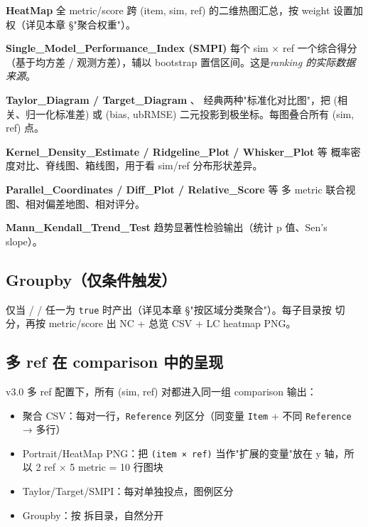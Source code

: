 \textbf{HeatMap}  全 metric/score 跨 (item, sim, ref) 的二维热图汇总，按 weight 设置加权（详见本章 §"聚合权重"）。

\textbf{Single\_Model\_Performance\_Index (SMPI)}  每个 sim × ref 一个综合得分（基于均方差 / 观测方差），辅以 bootstrap 置信区间。这是\emph{ranking 的实际数据来源}。

\textbf{Taylor\_Diagram / Target\_Diagram} 、 经典两种"标准化对比图"，把 (相关、归一化标准差) 或 (bias, ubRMSE) 二元投影到极坐标。每图叠合所有 (sim, ref) 点。

\textbf{Kernel\_Density\_Estimate / Ridgeline\_Plot / Whisker\_Plot}  等 概率密度对比、脊线图、箱线图，用于看 sim/ref 分布形状差异。

\textbf{Parallel\_Coordinates / Diff\_Plot / Relative\_Score}  等 多 metric 联合视图、相对偏差地图、相对评分。

\textbf{Mann\_Kendall\_Trend\_Test}  趋势显著性检验输出（统计 p 值、Sen's slope）。

\subsection{Groupby（仅条件触发）}

仅当  /  /  任一为 \texttt{true} 时产出（详见本章 §"按区域分类聚合"）。每子目录按  切分，再按 metric/score 出 NC + 总览 CSV + LC heatmap PNG。

\subsection{多 ref 在 comparison 中的呈现}

\openbench{} v3.0 多 ref 配置下，所有 (sim, ref) 对都进入同一组 comparison 输出：

\begin{itemize}
  \item 聚合 CSV：每对一行，\texttt{Reference} 列区分（同变量 \texttt{Item} + 不同 \texttt{Reference} → 多行）
  \item Portrait/HeatMap PNG：把 \texttt{(item × ref)} 当作"扩展的变量"放在 y 轴，所以 2 ref × 5 metric = 10 行图块
  \item Taylor/Target/SMPI：每对单独投点，图例区分
  \item Groupby：按  拆目录，自然分开
\end{itemize}

